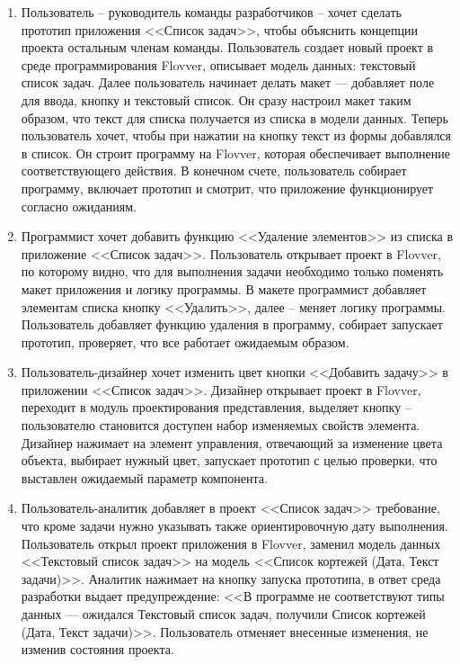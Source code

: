 \begin{enumerate}
    \item Пользователь -- руководитель команды разработчиков -- хочет сделать прототип приложения <<Список задач>>,
	чтобы объяснить концепции проекта остальным членам команды. 
	Пользователь создает новый проект в среде программирования Flovver, описывает модель данных: текстовый список задач.
	Далее пользователь начинает делать макет --- добавляет поле для ввода, кнопку и текстовый список.
    Он сразу настроил макет таким образом, что текст для списка получается из списка в модели данных.
    Теперь пользователь хочет, чтобы при нажатии на кнопку текст из формы добавлялся в список.
	Он строит программу на Flovver, которая обеспечивает выполнение соответствующего действия.
    В конечном счете, пользователь собирает программу, включает прототип и смотрит, что приложение функционирует согласно ожиданиям.

    \item Программист хочет добавить функцию <<Удаление элементов>> из списка в приложение <<Список задач>>.
	Пользователь открывает проект в Flovver, по которому видно, что для выполнения задачи необходимо только 
	поменять макет приложения и логику программы.
	В макете программист добавляет элементам списка кнопку <<Удалить>>, далее -- меняет логику программы.
	Пользователь добавляет функцию удаления в программу, собирает запускает прототип, проверяет, что все работает ожидаемым образом.

    \item Пользователь-дизайнер хочет изменить цвет кнопки <<Добавить задачу>> в приложении <<Список задач>>.
	Дизайнер открывает проект в Flovver, переходит в модуль проектирования представления, выделяет кнопку --
	пользователю становится доступен набор изменяемых свойств элемента. Дизайнер нажимает на элемент управления,
	отвечающий за изменение цвета объекта, выбирает нужный цвет, запускает прототип с целью проверки, что выставлен
	ожидаемый параметр компонента.

    \item Пользователь-аналитик добавляет в проект <<Список задач>> требование, что кроме задачи нужно
	указывать также ориентировочную дату выполнения.
	Пользователь открыл проект приложения в Flovver, заменил модель данных <<Текстовый список задач>>
	на модель <<Список кортежей (Дата, Текст задачи)>>. Аналитик нажимает на кнопку запуска прототипа,
	в ответ среда разработки выдает предупреждение: 
	<<В программе не соответствуют типы данных --- ожидался Текстовый список задач, получили Список кортежей (Дата, Текст задачи)>>.
	Пользователь отменяет внесенные изменения, не изменив состояния проекта.
\end{enumerate}

